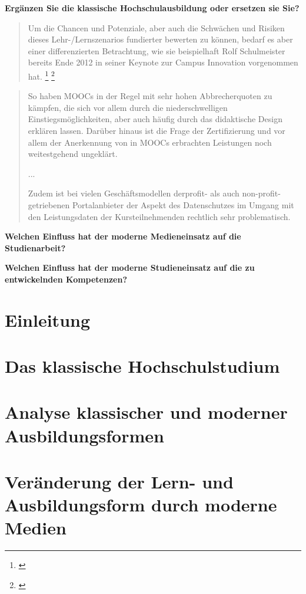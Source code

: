 \documentclass[150]{HSMW-Thesis}
\begin{document}
\textbf{Ergänzen Sie die klassische Hochschulausbildung oder ersetzen sie Sie?}


\begin{quote}
Um  die  Chancen  und  Potenziale,  aber  auch  die  Schwächen  und  Risiken  dieses Lehr-/Lernszenarios fundierter bewerten zu können, bedarf es aber einer differenzierten 
Betrachtung, wie sie beispielhaft Rolf Schulmeister bereits Ende 2012 in seiner Keynote zur  Campus  Innovation  vorgenommen  hat. \footnote{\cite[S. 7 ff.]{Schulmeister2013} } \footnote{\cite{digitalkompakt07}}
\end{quote}

\begin{quote}
So haben MOOCs in der Regel mit sehr hohen Abbrecherquoten zu kämpfen, die sich vor allem durch die niederschwelligen Einstiegsmöglichkeiten, 
aber auch häufig durch das didaktische Design erklären lassen. Darüber hinaus ist die Frage der Zertifizierung und vor allem der Anerkennung von in MOOCs erbrachten Leistungen 
noch weitestgehend ungeklärt. 

... 

Zudem ist bei vielen Geschäftsmodellen derprofit- als auch non-profit-getriebenen Portalanbieter der Aspekt des Datenschutzes 
im Umgang mit den Leistungsdaten der Kursteilnehmenden rechtlich sehr problematisch.
\end{quote} 

\textbf{Welchen Einfluss hat der moderne Medieneinsatz auf die Studienarbeit?}

\textbf{Welchen Einfluss hat der moderne Studieneinsatz auf die zu entwickelnden Kompetenzen?}

\chapter{Einleitung}

\chapter{Das klassische Hochschulstudium}

\chapter{Analyse klassischer und moderner Ausbildungsformen}

\chapter{Veränderung der Lern- und Ausbildungsform durch moderne Medien}
\end{document}
